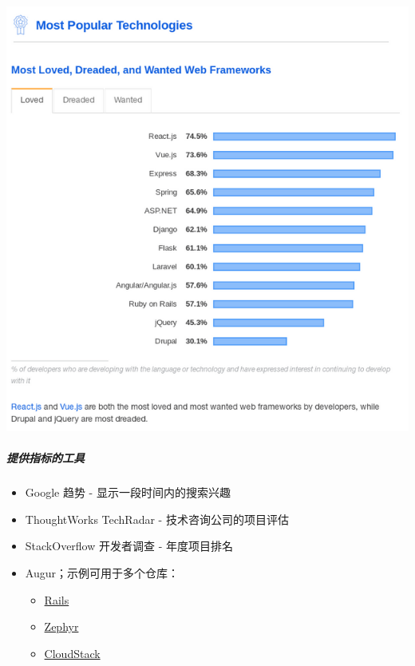 \includegraphics{images/organizational-project-skill-demand_stack-overflow.png}

\hypertarget{ux63d0ux4f9bux6307ux6807ux7684ux5de5ux5177}{%
\subparagraph{提供指标的工具}\label{ux63d0ux4f9bux6307ux6807ux7684ux5de5ux5177}}

\begin{itemize}
\tightlist
\item
  Google 趋势 - 显示一段时间内的搜索兴趣
\item
  ThoughtWorks TechRadar - 技术咨询公司的项目评估
\item
  StackOverflow 开发者调查 - 年度项目排名
\item
  Augur；示例可用于多个仓库：

  \begin{itemize}
  \tightlist
  \item
    \href{http://augur.osshealth.io/repo/Rails\%20(wg-value)/rails/overview}{Rails}
  \item
    \href{http://augur.osshealth.io/repo/Zephyr-RTOS/zephyr/overview}{Zephyr}
  \item
    \href{http://augur.osshealth.io/repo/Apache\%20(wg-value)/cloudstack/overview}{CloudStack}
  \end{itemize}
\end{itemize}


